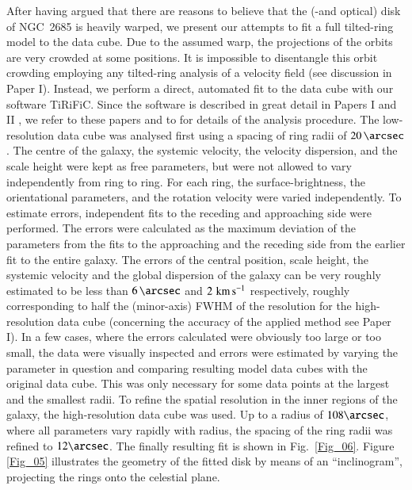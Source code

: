 \documentclass[oldversion]{aa}
\begin{document}
%
%
After having argued that there are reasons to believe that the
 (-and optical) disk of NGC~2685 is heavily warped, we
present our attempts to fit a full tilted-ring model to the data
cube. Due to the assumed warp, the projections of the orbits are very
crowded at some positions. It is impossible to disentangle this orbit
crowding employing any tilted-ring analysis of a velocity field (see
discussion in Paper I). Instead, we perform a direct, automated fit to
the data cube with our software TiRiFiC. Since the software is
described in great detail in Papers I and II
\citep[][]{Jozsa07a,Jozsa07b}, we refer to these papers and to
\citet[][]{Jozsa06} for details of the analysis procedure. The
low-resolution data cube was analysed first using a spacing of ring
radii of $20\,\arcsec$.  The centre of the galaxy, the systemic
velocity, the velocity dispersion, and the scale height were kept as
free parameters, but were not allowed to vary independently from ring
to ring. For each ring, the surface-brightness, the orientational
parameters, and the rotation velocity were varied independently.  To
estimate errors, independent fits to the receding and approaching side
were performed.  The errors were calculated as the maximum deviation
of the parameters from the fits to the approaching and the receding
side from the earlier fit to the entire galaxy. The errors of the
central position, scale height, the systemic velocity and the global
dispersion of the galaxy can be very roughly estimated to be less than
$6\,\arcsec$ and $2\,\,{\rm km}\,{\rm s}^{-1}$ respectively, roughly
corresponding to half the (minor-axis) FWHM of the resolution for the
high-resolution data cube (concerning the accuracy of the applied
method see Paper I). In a few cases, where the errors calculated were
obviously too large or too small, the data were visually inspected and
errors were estimated by varying the parameter in question and
comparing resulting model data cubes with the original data cube. This
was only necessary for some data points at the largest and the
smallest radii. To refine the spatial resolution in the inner regions
of the galaxy, the high-resolution data cube was used. Up to a radius
of $108\arcsec$, where all parameters vary rapidly with radius, the
spacing of the ring radii was refined to $12\arcsec$. The finally
resulting fit is shown in Fig.~\ref{Fig_06}. Figure \ref{Fig_05}
illustrates the geometry of the fitted disk by means of an
``inclinogram'', projecting the rings onto the celestial plane.
\end{document}

